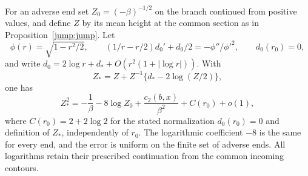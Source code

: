 \begin{proposition}\label{phase:expansion}
For an adverse end set $Z_0=(-\beta)^{-1/2}$ on the branch continued from
positive values, and define $Z$ by its mean height at the common section
as in Proposition~\ref{jump:jump}.  Let
\[
 \phi(r)=\sqrt{1-r^2/2},\qquad
 (1/r-r/2)d_0'+d_0/2=-\phi''/\phi'^2,\qquad d_0(r_0)=0,
\]
and write $d_0=2\log r+d_*+O(r^2(1+|\log r|))$.
With
\[
 Z_*=Z+Z^{-1}\{d_*-2\log(Z/2)\},
\]
one has
\begin{equation}
 Z_*^2=-\frac1\beta-8\log Z_0+\frac{c_2(b,x)}{\beta^2}
                                  +C(r_0)+o(1),
 \label{phase:expansion-eq}
\end{equation}
where $C(r_0)=2+2\log2$ for the stated normalization $d_0(r_0)=0$
and definition of $Z_*$, independently of $r_0$.  The logarithmic
coefficient $-8$ is the same for every end, and the error is uniform
on the finite set of adverse ends.  All logarithms retain their
prescribed continuation from the common incoming contours.
\end{proposition}
